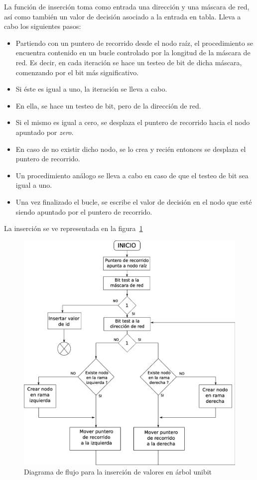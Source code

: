 La función de inserción toma como entrada una dirección y una máscara de red, así como también un valor de decisión asociado a la entrada en tabla. Lleva a cabo los siguientes pasos:
\begin{itemize}
	\item Partiendo con un puntero de recorrido desde el nodo raíz, el procedimiento se encuentra contenido en un bucle controlado por la longitud de la máscara de red. Es decir, en cada iteración se hace un testeo de bit de dicha máscara, comenzando por el bit más significativo. 
	\item Si éste es igual a uno, la iteración se lleva a cabo.
	\item En ella, se hace un testeo de bit, pero de la dirección de red.
	\item Si el mismo es igual a cero, se desplaza el puntero de recorrido hacia el nodo apuntado por \textit{zero}.
	\item En caso de no existir dicho nodo, se lo crea y recién entonces se desplaza el puntero de recorrido.
	\item Un procedimiento análogo se lleva a cabo en caso de que el testeo de bit sea igual a uno.
	\item Una vez finalizado el bucle, se escribe el valor de decisión en el nodo que esté siendo apuntado por el puntero de recorrido.
\end{itemize}

La inserción se ve representada en la figura~\ref{fig:utlinsertfc}

\begin{figure}[H]
  \centering
	\includegraphics[scale=0.35]{4-implementacion/graf/utlinsert.eps}
  \caption{Diagrama de flujo para la inserción de valores en árbol unibit}
  \label{fig:utlinsertfc}
\end{figure}


